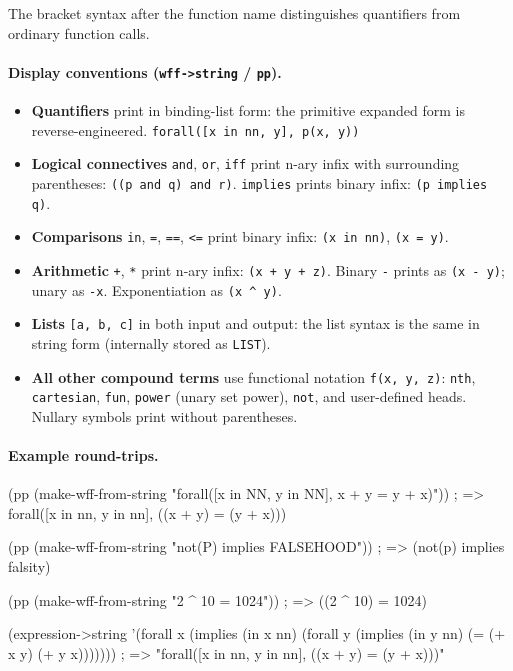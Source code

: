 \documentclass{amsbook}[openany]
\theoremstyle{definition}
\theoremstyle{remark}
\theoremstyle{remark}
\begin{document}
\noindent
The bracket syntax after the function name distinguishes quantifiers
from ordinary function calls.

\paragraph{Display conventions (\texttt{wff->string} / \texttt{pp}).}
\begin{itemize}[label=\textendash, leftmargin=1cm]
\item \textbf{Quantifiers} print in binding-list form:
  the primitive expanded form is reverse-engineered.
  \texttt{forall([x in nn, y], p(x, y))}
\item \textbf{Logical connectives} \texttt{and}, \texttt{or}, \texttt{iff}
  print n-ary infix with surrounding parentheses:
  \texttt{((p and q) and r)}.
  \texttt{implies} prints binary infix: \texttt{(p implies q)}.
\item \textbf{Comparisons} \texttt{in}, \texttt{=}, \texttt{==},
  \texttt{<=} print binary infix: \texttt{(x in nn)}, \texttt{(x = y)}.
\item \textbf{Arithmetic} \texttt{+}, \texttt{*} print n-ary infix:
  \texttt{(x + y + z)}.  Binary \texttt{-} prints as \texttt{(x - y)};
  unary as \texttt{-x}.  Exponentiation as \texttt{(x \textasciicircum{} y)}.
\item \textbf{Lists} \texttt{[a, b, c]} in both input and output: the
  list syntax is the same in string form (internally stored as \texttt{LIST}).
\item \textbf{All other compound terms} use functional notation
  \texttt{f(x, y, z)}: \texttt{nth}, \texttt{cartesian}, \texttt{fun},
  \texttt{power} (unary set power), \texttt{not}, and user-defined heads.
  Nullary symbols print without parentheses.
\end{itemize}

\paragraph{Example round-trips.}
\begin{VNBsnip}
(pp (make-wff-from-string "forall([x in NN, y in NN], x + y = y + x)"))
; => forall([x in nn, y in nn], ((x + y) = (y + x)))

(pp (make-wff-from-string "not(P) implies FALSEHOOD"))
; => (not(p) implies falsity)

(pp (make-wff-from-string "2 ^ 10 = 1024"))
; => ((2 ^ 10) = 1024)

(expression->string '(forall x (implies (in x nn)
                       (forall y (implies (in y nn) (= (+ x y) (+ y x)))))))
; => "forall([x in nn, y in nn], ((x + y) = (y + x)))"
\end{VNBsnip}
\end{document}

